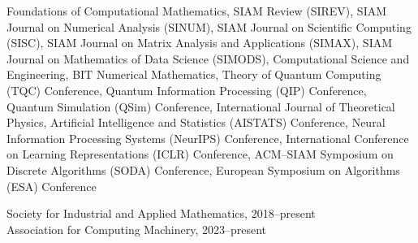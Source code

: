 
\begin{cvhonors}
  

\end{cvhonors}


{\leftskip=0pt \parindent=0pt \footnotesize \color{black}
Foundations of Computational Mathematics, SIAM Review (SIREV), SIAM Journal on Numerical Analysis (SINUM), SIAM Journal on Scientific Computing (SISC), SIAM Journal on Matrix Analysis and Applications (SIMAX), SIAM Journal on Mathematics of Data Science (SIMODS), Computational Science and Engineering, BIT Numerical Mathematics, Theory of Quantum Computing (TQC) Conference, Quantum Information Processing (QIP) Conference, Quantum Simulation (QSim) Conference, International Journal of Theoretical Physics, Artificial Intelligence and Statistics (AISTATS) Conference, Neural Information Processing Systems (NeurIPS) Conference, International Conference on Learning Representations (ICLR) Conference, ACM--SIAM Symposium on Discrete Algorithms (SODA) Conference, European Symposium on Algorithms (ESA) Conference
}


\begin{small} \leftskip=0pt \parindent=0pt \color{black}
Society for Industrial and Applied Mathematics, 2018--present \\
Association for Computing Machinery, 2023--present
\end{small}
